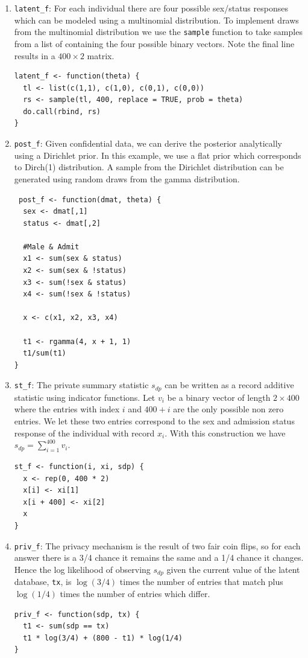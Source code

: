 \begin{enumerate}
\def\labelenumi{\arabic{enumi}.}
\item
  \texttt{latent\_f}: For each individual there are four possible
  sex/status responses which can be modeled using a multinomial distribution.
  To implement draws from the multinomial distribution we use the \texttt{sample} function
  to take samples from a list of containing the four possible binary vectors. Note
  the final line results in a \(400 \times 2\) matrix.

\begin{verbatim}
latent_f <- function(theta) {
  tl <- list(c(1,1), c(1,0), c(0,1), c(0,0))
  rs <- sample(tl, 400, replace = TRUE, prob = theta)
  do.call(rbind, rs)
}
\end{verbatim}
\item
  \texttt{post\_f}: Given confidential data, we can derive the posterior analytically
  using a Dirichlet prior. In this example, we use a flat prior which
  corresponds to Dirch(1) distribution. A sample from the Dirichlet distribution
  can be generated using random draws from the gamma distribution.

\begin{verbatim}
 post_f <- function(dmat, theta) {
  sex <- dmat[,1]
  status <- dmat[,2]

  #Male & Admit
  x1 <- sum(sex & status)
  x2 <- sum(sex & !status)
  x3 <- sum(!sex & status)
  x4 <- sum(!sex & !status)

  x <- c(x1, x2, x3, x4)

  t1 <- rgamma(4, x + 1, 1)
  t1/sum(t1)
}
\end{verbatim}
\item
  \texttt{st\_f}: The private summary statistic \(s_{dp}\) can be written as a record additive
  statistic using indicator functions. Let \(v_i\) be a binary vector of length \(2 \times 400\)
  where the entries with index \(i\) and \(400 + i\) are the only possible non zero entries.
  We let these two entries correspond to the sex and admission status response of
  the individual with record \(x_i\). With this construction we have \(s_{dp} = \sum_{i=1}^{400} v_i\).

\begin{verbatim}
st_f <- function(i, xi, sdp) {
  x <- rep(0, 400 * 2)
  x[i] <- xi[1]
  x[i + 400] <- xi[2]
  x
}
\end{verbatim}
\item
  \texttt{priv\_f}: The privacy mechanism is the result of two fair coin flips, so for
  each answer there is a 3/4 chance it remains the same and a 1/4 chance it changes.
  Hence the log likelihood of observing \(s_{dp}\) given the current value of the latent
  database, \texttt{tx}, is \(\log(3/4)\) times the number of entries that match plus \(\log(1/4)\) times
  the number of entries which differ.

\begin{verbatim}
priv_f <- function(sdp, tx) {
  t1 <- sum(sdp == tx)
  t1 * log(3/4) + (800 - t1) * log(1/4)
}
\end{verbatim}
\end{enumerate}

